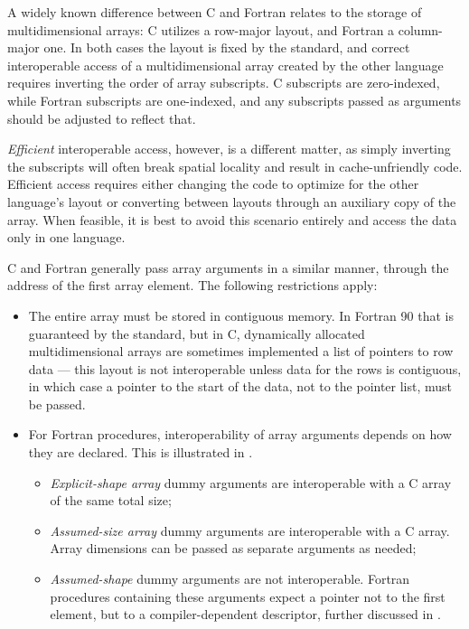 A widely known difference between C and Fortran relates to the storage of multidimensional arrays: C utilizes a row-major layout, and Fortran a column-major one. In both cases the layout is fixed by the standard, and correct interoperable access of a multidimensional array created by the other language requires inverting the order of array subscripts. C subscripts are zero-indexed, while Fortran subscripts are one-indexed, and any subscripts passed as arguments should be adjusted to reflect that.

\textit{Efficient} interoperable access, however, is a different matter, as simply inverting the subscripts will often break spatial locality and result in cache-unfriendly code. Efficient access requires either changing the code to optimize for the other language's layout or converting between layouts through an auxiliary copy of the array. When feasible, it is best to avoid this scenario entirely and access the data only in one language.

C and Fortran generally pass array arguments in a similar manner, through the address of the first array element. The following restrictions apply:
\begin{itemize}
	\item The entire array must be stored in contiguous memory. In Fortran 90 that is guaranteed by the standard, but in C, dynamically allocated multidimensional arrays are sometimes implemented a list of pointers to row data --- this layout is not interoperable unless data for the rows is contiguous, in which case a pointer to the start of the data, not to the pointer list, must be passed.
	\item For Fortran procedures, interoperability of array arguments depends on how they are declared. This is illustrated in .
		\begin{itemize}
			\item \textit{Explicit-shape array} dummy arguments are interoperable with a C array of the same total size;
			\item \textit{Assumed-size array} dummy arguments are interoperable with a C array. Array dimensions can be passed as separate arguments as needed;
			\item \textit{Assumed-shape} dummy arguments are not interoperable. Fortran procedures containing these arguments expect a pointer not to the first element, but to a compiler-dependent descriptor, further discussed in .
		\end{itemize}
\end{itemize}

